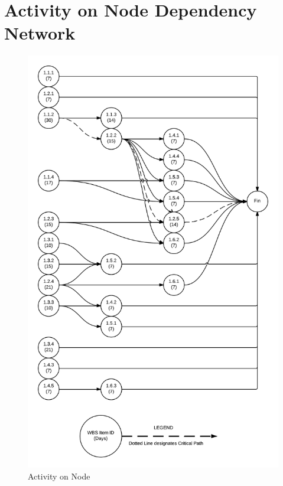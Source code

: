 \section{Activity on Node Dependency Network}
\begin{figure}[H]
\centering
\includegraphics[width=.75\textwidth]{AON.png}
\caption{Activity on Node}
\label{fig:Activity on Node}
\end{figure}
